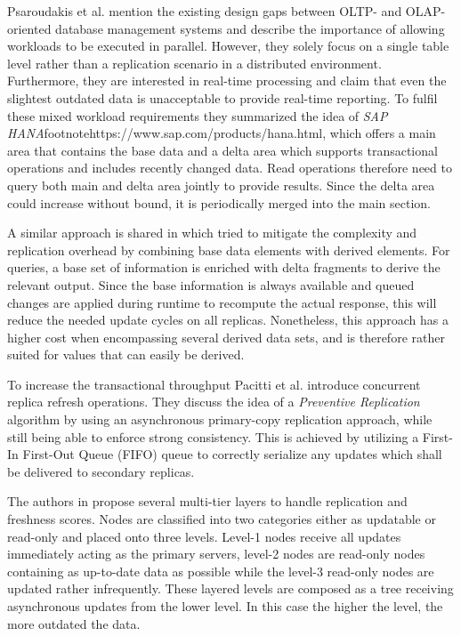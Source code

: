 Psaroudakis et al. \cite{psaroudakis:2015} mention the existing design gaps between OLTP- and OLAP-oriented database management systems and describe the importance of 
allowing workloads to be executed in parallel. However, they solely focus on a single table level rather than a replication scenario in a distributed 
environment. Furthermore, they are interested in real-time processing and claim that even the slightest outdated data is unacceptable to provide real-time reporting.
To fulfil these mixed workload requirements they summarized the idea of \emph{SAP HANA}footnote{https://www.sap.com/products/hana.html}, which offers a main area that contains the base data and a delta area 
which supports transactional operations and includes recently changed data. Read operations therefore need to query both main and delta area jointly to provide results. 
Since the delta area could increase without bound, it is periodically merged into the main section. 


A similar approach is shared in \cite{wei:2004} which tried to mitigate the complexity and replication overhead by combining base data elements with derived elements.
For queries, a base set of information is enriched with delta fragments to derive the relevant output.
Since the base information is always available and queued changes are applied during runtime to recompute 
the actual response, this will reduce the needed update cycles on all replicas. Nonetheless, this approach has a higher cost when encompassing several derived data sets, and 
is therefore rather suited for values that can easily be derived.


To increase the transactional throughput Pacitti et al. \cite{pacitti:2005} introduce concurrent replica refresh operations.
They discuss the idea of a \emph{Preventive Replication} algorithm by using an asynchronous primary-copy replication approach, while still being able to enforce
strong consistency. This is achieved by utilizing a First-In First-Out Queue (FIFO) queue to correctly serialize any updates which shall be delivered to secondary replicas.

The authors in \cite{voicu:2010} propose several multi-tier layers to handle replication and freshness scores. 
Nodes are classified into two categories either as updatable or read-only and placed onto three levels.
Level-1 nodes receive all updates immediately acting as the primary servers, level-2 nodes are read-only nodes containing as up-to-date data as possible while the
level-3 read-only nodes are updated rather infrequently. These layered levels are composed as a tree receiving asynchronous updates from the lower level. 
In this case the higher the level, the more outdated the data.

